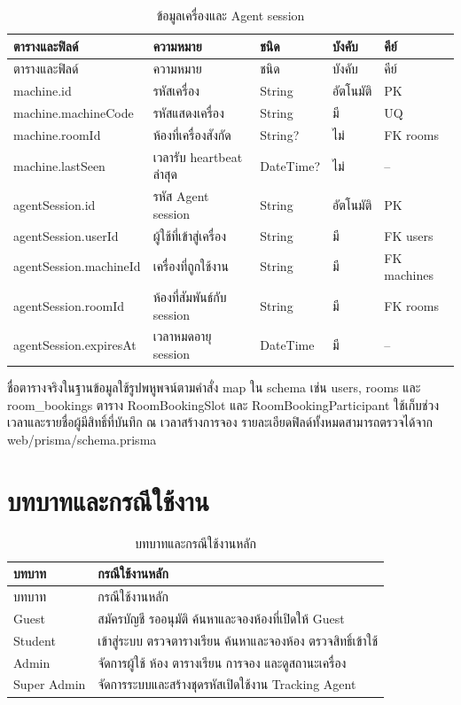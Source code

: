 \documentclass[14pt,a4paper,oneside]{extreport}
\begin{document}
{\clearpage
\begin{longtable}{L{29mm}L{56mm}L{24mm}L{18mm}L{17mm}}
\caption{ข้อมูลเครื่องและ Agent session}\\\toprule ตารางและฟิลด์ & ความหมาย & ชนิด & บังคับ & คีย์\\\midrule\endfirsthead
\toprule ตารางและฟิลด์ & ความหมาย & ชนิด & บังคับ & คีย์\\\midrule\endhead
machine.id & รหัสเครื่อง & String & อัตโนมัติ & PK\\
machine.machineCode & รหัสแสดงเครื่อง & String & มี & UQ\\
machine.roomId & ห้องที่เครื่องสังกัด & String? & ไม่ & FK rooms\\
machine.lastSeen & เวลารับ heartbeat ล่าสุด & DateTime? & ไม่ & --\\
agentSession.id & รหัส Agent session & String & อัตโนมัติ & PK\\
agentSession.userId & ผู้ใช้ที่เข้าสู่เครื่อง & String & มี & FK users\\
agentSession.machineId & เครื่องที่ถูกใช้งาน & String & มี & FK machines\\
agentSession.roomId & ห้องที่สัมพันธ์กับ session & String & มี & FK rooms\\
agentSession.expiresAt & เวลาหมดอายุ session & DateTime & มี & --\\
\bottomrule\end{longtable}
}

ชื่อตารางจริงในฐานข้อมูลใช้รูปพหูพจน์ตามคำสั่ง map ใน schema เช่น users, rooms และ room\_bookings ตาราง RoomBookingSlot และ RoomBookingParticipant ใช้เก็บช่วงเวลาและรายชื่อผู้มีสิทธิ์ที่บันทึก ณ เวลาสร้างการจอง รายละเอียดฟิลด์ทั้งหมดสามารถตรวจได้จาก web/prisma/schema.prisma

\section{บทบาทและกรณีใช้งาน}
\begin{longtable}{L{33mm}L{105mm}}\caption{บทบาทและกรณีใช้งานหลัก}\\\toprule บทบาท & กรณีใช้งานหลัก\\\midrule\endfirsthead
\toprule บทบาท & กรณีใช้งานหลัก\\\midrule\endhead
Guest & สมัครบัญชี รออนุมัติ ค้นหาและจองห้องที่เปิดให้ Guest\\
Student & เข้าสู่ระบบ ตรวจตารางเรียน ค้นหาและจองห้อง ตรวจสิทธิ์เข้าใช้\\
Admin & จัดการผู้ใช้ ห้อง ตารางเรียน การจอง และดูสถานะเครื่อง\\
Super Admin & จัดการระบบและสร้างชุดรหัสเปิดใช้งาน Tracking Agent\\\bottomrule\end{longtable}
\end{document}
